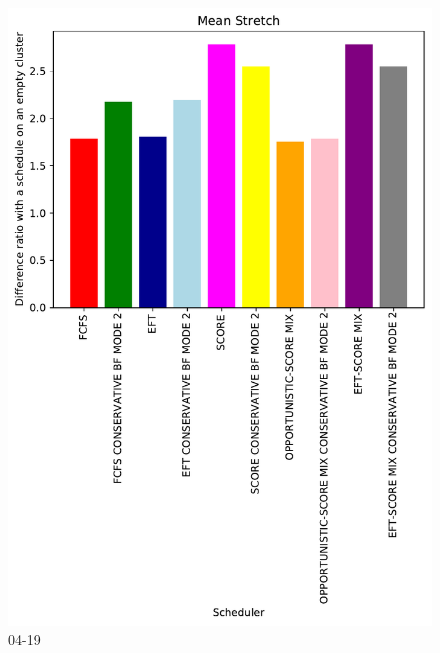 \documentclass[a4paper]{article}
\begin{document}
\begin{figure}\includegraphics[width=0.9\linewidth]{MBSS/plot/Results_FCFS_Score_Backfill_2022-04-19->2022-04-19_V10000_Mean_Stretch_450_128_32_256_4_1024.pdf}\caption{04-19}\end{figure}
\end{document}
